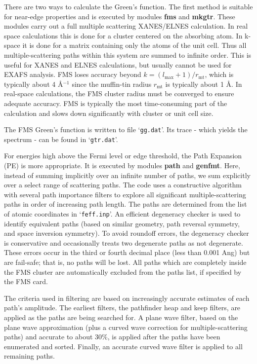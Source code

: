 \documentclass[11pt,oneside]{report} %
\renewcommand{\htmlref}[2]{\hyperlink{#2}{#1}}
\newcommand{\file}[1]{`\texttt{#1}'}
\newcommand{\module}[1]{\textrm{\bf{#1}}}
\renewcommand{\htmlref}[2]{{#1}} %
\begin{document}
There are two ways to calculate the Green's function.  The first method is suitable for near-edge properties and is executed by modules \module{fms} and \module{mkgtr}.
These modules carry out a full multiple scattering XANES/ELNES calculation.  
In real space calculations this is done for a cluster centered on the absorbing atom. In k-space it is done
for a matrix containing only the atoms of the unit cell.  Thus all multiple-scattering paths within this system are summed to infinite
order. This is useful for XANES and ELNES calculations, but usually cannot be
used for EXAFS analysis. FMS loses accuracy beyond $k =
(l_{\mathrm{max}}+1)/r_{\mathrm{mt}}$, which is typically about 4
\AA$^{-1}$ since the muffin-tin radius $r_{\mathrm{mt}}$ is
typically about 1 \AA.  In real-space calculations, the FMS cluster radius must be converged to ensure adequate accuracy.
FMS is typically the most time-consuming part of the calculation and slows down significantly with cluster or unit cell size.

The FMS Green's function is written to file \file{gg.dat}.  Its trace - which yields the spectrum - can be found in \file{gtr.dat}.

For energies high above the Fermi level or edge threshold, the Path Expansion (PE) is more appropriate.  It is executed by modules \module{path} and \module{genfmt}.  Here, instead of summing implicitly over an infinite number of paths, we sum explicitly over a select range of scattering paths.  The code uses a constructive algorithm with several path importance
filters to explore all significant multiple-scattering paths in order
of increasing path length. The paths are determined from the list of
atomic coordinates in \file{feff.inp}. An efficient degeneracy
checker is used to identify equivalent paths (based on similar
geometry, path reversal symmetry, and space inversion symmetry). To
avoid roundoff errors, the degeneracy checker is conservative and
occasionally treats two degenerate paths as not degenerate.
These errors occur in the third or fourth decimal place (less than
0.001 Ang) but are fail-safe; that is, no paths will be lost. All 
paths which are completely inside the FMS cluster are automatically 
excluded from the paths list, if specified by the \htmlref{FMS}{card:fms} 
card.

The criteria used in filtering are based on increasingly accurate
estimates of each path's amplitude. The earliest filters, the
pathfinder heap and keep filters, are applied as the paths are being
searched for. A plane wave filter, based on the plane wave approximation
(plus a curved wave correction for multiple-scattering paths) and
accurate to about 30\%, is applied after the paths have been enumerated
and sorted. Finally, an accurate curved wave filter is applied to
all remaining paths.
\end{document}
